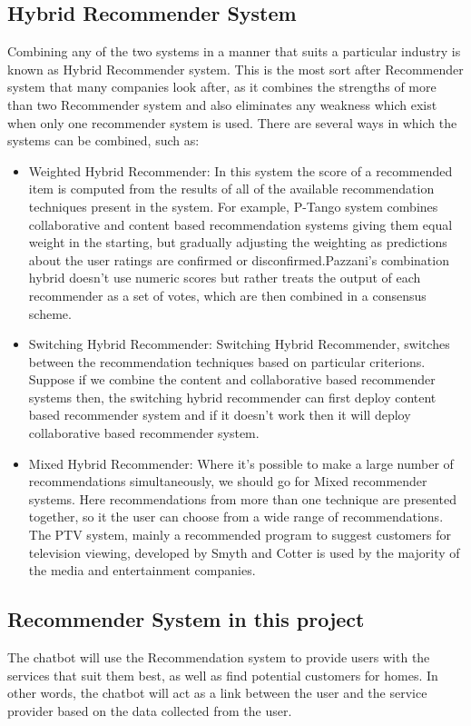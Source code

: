 \subsection{Hybrid Recommender System}
Combining any of the two systems in a manner that suits a particular industry is known as Hybrid Recommender system. This is the most sort after Recommender system that many companies look after, as it combines the strengths of more than two Recommender system and also eliminates any weakness which exist when only one recommender system is used. There are several ways in which the systems can be combined, such as:


\begin{itemize}
\item Weighted Hybrid Recommender: In this system the score of a recommended item is computed from the results of all of the available recommendation techniques present in the system. For example, P-Tango system combines collaborative and content based recommendation systems giving them equal weight in the starting, but gradually adjusting the weighting as predictions about the user ratings are confirmed or disconfirmed.Pazzani’s combination hybrid doesn’t use numeric scores but rather treats the output of each recommender as a set of votes, which are then combined in a consensus scheme.
\item Switching Hybrid Recommender: Switching Hybrid Recommender, switches between the recommendation techniques based on particular criterions. Suppose if we combine the content and collaborative based recommender systems then, the switching hybrid recommender can first deploy content based recommender system and if it doesn’t work then it will deploy collaborative based recommender system.
\item Mixed Hybrid Recommender: Where it’s possible to make a large number of recommendations simultaneously, we should go for Mixed recommender systems. Here recommendations from more than one technique are presented together, so it the user can choose from a wide range of recommendations.  The PTV system, mainly a recommended program to suggest customers for television viewing, developed by Smyth and Cotter is used by the majority of the media and entertainment companies.
\end{itemize}
\subsection{Recommender System in this project}
The chatbot will use the Recommendation system to provide users with the services that suit them best, as well as find potential customers for homes. In other words, the chatbot will act as a link between the user and the service provider based on the data collected from the user.

